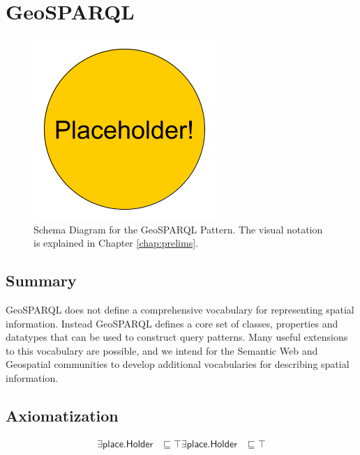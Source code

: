 \section{GeoSPARQL}
\label{sec:GeoSPARQL}
\begin{figure}[h!]
\begin{center}
\includegraphics[width=.8\textwidth]{figures/placeholder}
\end{center}
\caption{Schema Diagram for the GeoSPARQL Pattern. The visual notation is explained in Chapter \ref{chap:prelims}.}
\label{fig:GeoSPARQL}
\end{figure}
\subsection{Summary}
\label{sum:GeoSPARQL}
GeoSPARQL does not define a comprehensive vocabulary for representing spatial information. Instead GeoSPARQL defines a core set of classes, properties and datatypes that can be used to construct query patterns. Many useful extensions to this vocabulary are possible, and we intend for the Semantic Web and Geospatial communities to develop additional vocabularies for describing spatial information.

\subsection{Axiomatization}
\label{axs:GeoSPARQL}
\begin{align}
\exists\textsf{place.Holder} &\sqsubseteq \top 
\exists\textsf{place.Holder} &\sqsubseteq \top 
\end{align}

